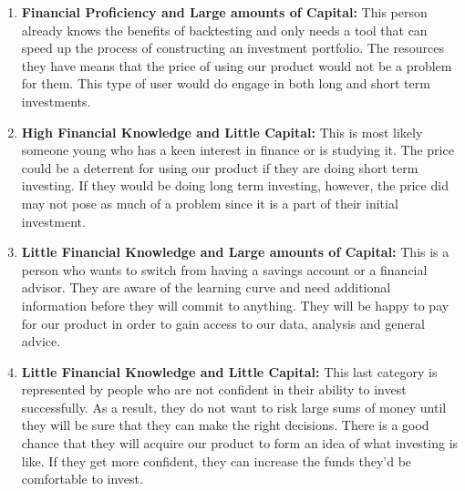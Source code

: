 \documentclass[main.tex]{subfiles}
\begin{document}
\begin{enumerate}
    \item \textbf{Financial Proficiency and Large amounts of Capital:  }This person already knows the benefits of backtesting and only needs a tool that can speed up the process of constructing an investment portfolio. The resources they have means that the price of using our product would not be a problem for them. This type of user would do engage in both long and short term investments.
    \item \textbf{High Financial Knowledge and Little Capital:  } This is most likely someone young who has a keen interest in finance or is studying it. The price could be a deterrent for using our product if they are doing short term investing. If they would be doing long term investing, however, the price did may not pose as much of a problem since it is a part of their initial investment.
    \item \textbf{Little Financial Knowledge and Large amounts of Capital:  }This is a person who wants to switch from having a savings account or a financial advisor. They are aware of the learning curve and need additional information before they will commit to anything. They will be happy to pay for our product in order to gain access to our data, analysis and general advice.
    \item \textbf{Little Financial Knowledge and Little Capital:  }This  last category is represented by people who are not confident in their ability to invest successfully. As a result, they do not want to risk large sums of money until they will be sure that they can make the right decisions. There is a good chance that they will acquire our product to form an idea of what investing is like. If they get more confident, they can increase the funds they'd be comfortable to invest.
\end{enumerate}
\end{document}
